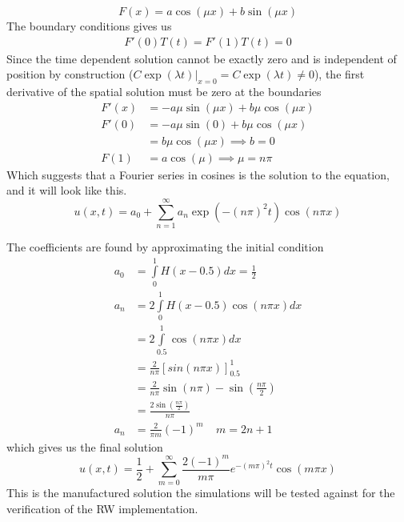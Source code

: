 \begin{equation*}
 F(x) = a\cos(\mu x) + b\sin(\mu x)
\end{equation*}
The boundary conditions gives us 
\begin{align*}
 F'(0)T(t) = F'(1)T(t) = 0
\end{align*}
Since the time dependent solution cannot be exactly zero and is independent of position by construction ($C\exp(\lambda t)|_{x=0} = C\exp(\lambda t) \neq 0$), the first derivative of the spatial solution must be zero at the boundaries
\begin{align*}
 F'(x) &= -a\mu\sin(\mu x) + b\mu\cos(\mu x) \\
 F'(0) &= -a \mu\sin(0) + b\mu\cos(\mu x) \\
 &= b\mu\cos(\mu x) \implies b=0 \\
 F(1) &= a\cos(\mu) \implies \mu = n\pi
\end{align*}
Which suggests that a Fourier series in cosines is the solution to the equation, and it will look like this.
\begin{equation}
 u(x,t) = a_0 + \sum\limits_{n=1}^\infty a_n\exp\left(-(n\pi)^2t\right)\cos(n\pi x)
\end{equation}

The coefficients are found by approximating the initial condition
\begin{align*}
 a_0 &= \int\limits_0^1H(x-0.5)dx = \frac{1}{2} \\
 a_n &= 2\int\limits_0^1H(x-0.5)\cos(n\pi x)dx \\
 &= 2\int\limits_{0.5}^1\cos(n\pi x)dx \\
 &= \frac{2}{n\pi}\left[sin(n\pi x)\right]_{0.5}^1 \\
 &= \frac{2}{n\pi}\sin(n\pi) - \sin(\frac{n\pi}{2}) \\
 &= \frac{2\sin(\frac{n\pi}{2})}{n\pi}\\
 a_n &= \frac{2}{\pi m} (-1)^m\;\;\;\; m=2n+1
\end{align*}
which gives us the final solution
\begin{equation}
 u(x,t) = \frac{1}{2} + \sum\limits_{m=0}^\infty \frac{2(-1)^m}{m\pi}e^{-(m\pi)^2t}\cos(m\pi x)
\end{equation}
This is the manufactured solution the simulations will be tested against for the verification of the RW implementation.

